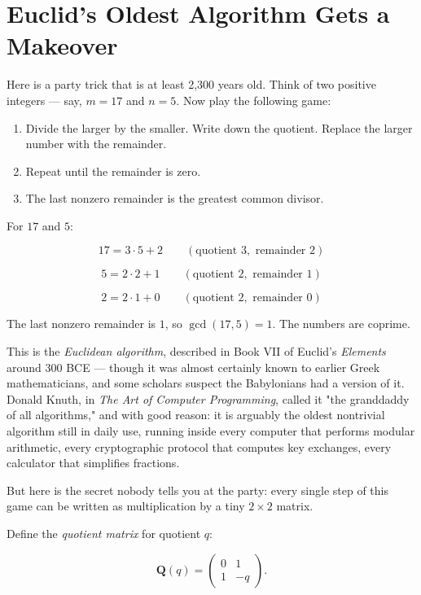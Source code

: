 \documentclass[11pt,openany]{book}
\theoremstyle{definition}
\theoremstyle{plain}
\theoremstyle{remark}
\begin{document}
\section*{Euclid's Oldest Algorithm Gets a Makeover}


Here is a party trick that is at least 2,300 years old. Think of two positive integers — say, $m = 17$ and $n = 5$. Now play the following game:

\begin{enumerate}
\item Divide the larger by the smaller. Write down the quotient. Replace the larger number with the remainder.
\item Repeat until the remainder is zero.
\item The last nonzero remainder is the greatest common divisor.
\end{enumerate}

For $17$ and $5$:

\[
17 = 3 \cdot 5 + 2 \qquad (\text{quotient } 3, \text{ remainder } 2)
\]

\[
5 = 2 \cdot 2 + 1 \qquad (\text{quotient } 2, \text{ remainder } 1)
\]

\[
2 = 2 \cdot 1 + 0 \qquad (\text{quotient } 2, \text{ remainder } 0)
\]


The last nonzero remainder is $1$, so $\gcd(17, 5) = 1$. The numbers are coprime.

This is the \textit{Euclidean algorithm}, described in Book VII of Euclid's \textit{Elements} around 300 BCE — though it was almost certainly known to earlier Greek mathematicians, and some scholars suspect the Babylonians had a version of it. Donald Knuth, in \textit{The Art of Computer Programming}, called it "the granddaddy of all algorithms," and with good reason: it is arguably the oldest nontrivial algorithm still in daily use, running inside every computer that performs modular arithmetic, every cryptographic protocol that computes key exchanges, every calculator that simplifies fractions.

But here is the secret nobody tells you at the party: every single step of this game can be written as multiplication by a tiny $2 \times 2$ matrix.

Define the \textit{quotient matrix} for quotient $q$:

\[
\mathbf{Q}(q) = \begin{pmatrix} 0 & 1 \\ 1 & -q \end{pmatrix}.
\]
\end{document}

